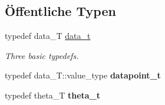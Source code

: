 \subsection*{Öffentliche Typen}
\begin{DoxyCompactItemize}
\item 
\hypertarget{classCDA_1_1EM_a3f4735ec5ea6c523ebc4c9f2b51be762}{
typedef data\_\-T \hyperlink{classCDA_1_1EM_a3f4735ec5ea6c523ebc4c9f2b51be762}{data\_\-t}}
\label{classCDA_1_1EM_a3f4735ec5ea6c523ebc4c9f2b51be762}

\begin{DoxyCompactList}\small\item\em Three basic typedefs. \item\end{DoxyCompactList}\item 
\hypertarget{classCDA_1_1EM_a3cdb34eebfa56d948080b28ca349bc6b}{
typedef data\_\-T::value\_\-type {\bfseries datapoint\_\-t}}
\label{classCDA_1_1EM_a3cdb34eebfa56d948080b28ca349bc6b}

\item 
\hypertarget{classCDA_1_1EM_a0f059ae36feb9040200627b78fb416e6}{
typedef theta\_\-T {\bfseries theta\_\-t}}
\label{classCDA_1_1EM_a0f059ae36feb9040200627b78fb416e6}

\end{DoxyCompactItemize}
